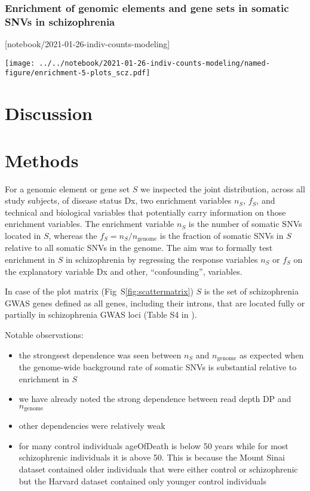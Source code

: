 \documentclass[letterpaper]{article}
\begin{document}
\subsubsection*{Enrichment of genomic elements and gene sets in somatic SNVs in schizophrenia}

[notebook/2021-01-26-indiv-counts-modeling]

\texttt{[image: ../../notebook/2021-01-26-indiv-counts-modeling/named-figure/enrichment-5-plots\_scz.pdf]}

\section*{Discussion}


\section*{Methods}

For a genomic element or gene set  \(S\) we inspected the joint distribution,
across all study subjects, of disease status Dx, two enrichment variables
\(n_S\), \(f_S\), and technical and biological variables that potentially
carry information on those enrichment variables.  The enrichment variable
\(n_S\) is the number of somatic SNVs located in \(S\), whereas the \(f_S =
	n_S/n_\mathrm{genome}\) is the fraction of somatic SNVs in \(S\)
relative to all somatic SNVs in the genome.  The aim was to formally test
enrichment in \(S\) in schizophrenia by regressing the response variables
\(n_S\) or \(f_S\) on the explanatory variable Dx
and other, ``confounding'', variables.

In case of the plot matrix (Fig~S\ref{fig:scattermatrix}) \(S\) is the set of schizophrenia GWAS genes
defined as all genes, including their introns, that are located fully or
partially in schizophrenia GWAS loci (Table S4 in \cite{Pardinas2018}).

Notable observations:
\begin{itemize}
	\item the strongsest dependence was seen between \(n_S\) and \(n_\mathrm{genome}\) as expected
		when the genome-wide background rate of somatic SNVs is
		substantial relative to enrichment in \(S\)
	\item we have already noted the strong dependence between read depth DP and
		\(n_\mathrm{genome}\)
        \item other dependencies were relatively weak
	\item for many control individuals ageOfDeath is below 50 years while for
		most schizophrenic individuals it is above 50.  This is
		because the Mount Sinai dataset contained older individuals
		that were either control or schizophrenic but the Harvard dataset contained
		only younger control individuals
\end{itemize}
\end{document}
